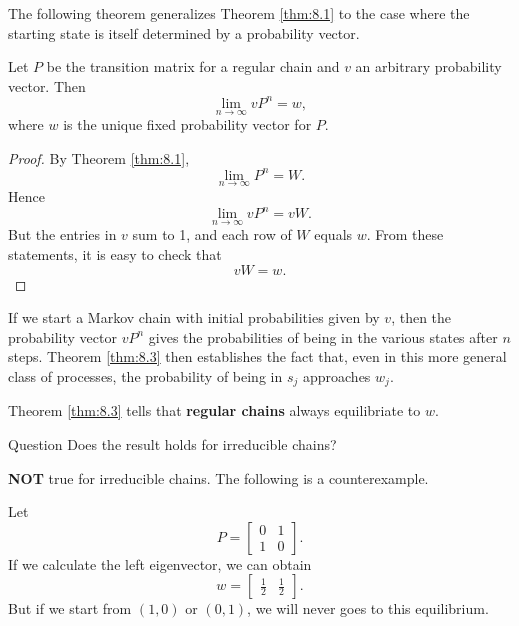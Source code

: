 The following theorem generalizes Theorem \ref{thm:8.1} to the case where the starting state is itself
determined by a probability vector.

\begin{theorem}
\label{thm:8.3}
Let $P$ be the transition matrix for a regular chain and $v$ an arbitrary probability vector. Then
\begin{equation*}
    \lim_{n\to\infty} vP^n = w,
\end{equation*}
where $w$ is the unique fixed probability vector for $P$.
\end{theorem}

\begin{proof}
By Theorem \ref{thm:8.1},
\begin{equation*}
    \lim_{n\to\infty} P^n = W.
\end{equation*}
Hence 
\begin{equation*}
    \lim_{n\to\infty} vP^n = vW.
\end{equation*}
But the entries in $v$ sum to 1, and each row of $W$ equals $w$. From these statements, it is easy to check that
\begin{equation*}
    vW = w.
\end{equation*}
\end{proof}

\begin{remark}
If we start a Markov chain with initial probabilities given by $v$, then the probability vector $v P^n$ gives the probabilities of being in the various states after $n$ steps. Theorem \ref{thm:8.3} then establishes the fact that, even in this more general class of processes, the probability of being in $s_j$ approaches $w_j$.
\end{remark}

\begin{remark}
Theorem \ref{thm:8.3} tells that \textbf{regular chains} always equilibriate to $w$.
\end{remark}

\begin{newnotion}{Question}
Does the result holds for irreducible chains?
\end{newnotion}
\textbf{NOT} true for irreducible chains. The following is a counterexample.
\begin{example}
Let 
\begin{equation*}
    P = \begin{bmatrix} 0 & 1 \\ 1 & 0 \end{bmatrix}.
\end{equation*}
If we calculate the left eigenvector, we can obtain 
\begin{equation*}
    w = \begin{bmatrix} \frac{1}{2} & \frac{1}{2} \end{bmatrix}.
\end{equation*}
But if we start from $(1,0)$ or $(0,1)$, we will never goes to this equilibrium.
\end{example}


